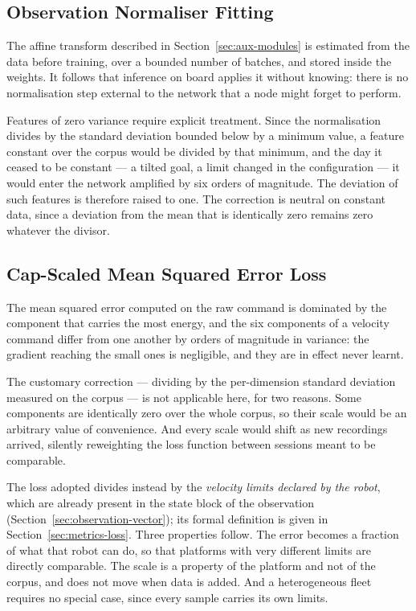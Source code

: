 \subsection{Observation Normaliser Fitting}
\label{sec:sl-normaliser}

The affine transform described in Section~\ref{sec:aux-modules} is estimated
from the data before training, over a bounded number of batches, and stored
inside the weights. It follows that inference on board applies it without
knowing: there is no normalisation step external to the network that a node
might forget to perform.

Features of zero variance require explicit treatment. Since the normalisation
divides by the standard deviation bounded below by a minimum value, a feature
constant over the corpus would be divided by that minimum, and the day it ceased
to be constant --- a tilted goal, a limit changed in the configuration --- it
would enter the network amplified by six orders of magnitude. The deviation of
such features is therefore raised to one. The correction is neutral on constant
data, since a deviation from the mean that is identically zero remains zero
whatever the divisor.

\subsection{Cap-Scaled Mean Squared Error Loss}
\label{sec:sl-loss}

The mean squared error computed on the raw command is dominated by the component
that carries the most energy, and the six components of a velocity command
differ from one another by orders of magnitude in variance: the gradient
reaching the small ones is negligible, and they are in effect never learnt.

The customary correction --- dividing by the per-dimension standard deviation
measured on the corpus --- is not applicable here, for two reasons. Some
components are identically zero over the whole corpus, so their scale would be
an arbitrary value of convenience. And every scale would shift as new recordings
arrived, silently reweighting the loss function between sessions meant to be
comparable.

The loss adopted divides instead by the \emph{velocity limits declared by the
robot}, which are already present in the state block of the observation
(Section~\ref{sec:observation-vector}); its formal definition is given in
Section~\ref{sec:metrics-loss}. Three properties follow. The error becomes a
fraction of what that robot can do, so that platforms with very different limits
are directly comparable. The scale is a property of the platform and not of the
corpus, and does not move when data is added. And a heterogeneous fleet requires
no special case, since every sample carries its own limits.

